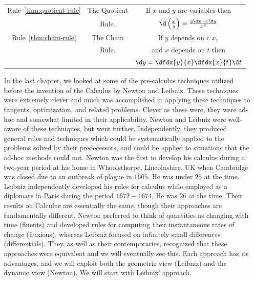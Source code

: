 \begin{table}
\begin{tabular}{ |c|c|c| }
    \hline{}
\small    Rule~\ref{thm:quotient-rule}&\small    The Quotient        &\small If $x$ and $y$ are variables then\\
    &\small           Rule.        &\small  $\d\left(\frac{x}{y}\right) = \frac{y\d x
      - x\d y}{x^2}$\\
    \hline
\small    Rule~\ref{thm:chain-rule}&\small    The Chain        &\small If $y$ depends on
c    $x,$ \\
    &\small    Rule.            &\small and $x$ depends on $t$ then\\
    &\small                     &\small  $\d y = \dfdx{y}{x}\dfdx{x}{t}\d t$\\[2mm]
    \hline
  \end{tabular}
\end{table}
In the last chapter, we looked at some of the pre-calculus techniques
utilized before the invention of the Calculus by Newton and Leibniz.
These techniques were extremely clever and much was accomplished in
applying these techniques to tangents, optimization, and related
problems.  Clever as these were, they were ad-hoc and somewhat limited
in their applicability.  Newton and Leibniz were well-aware of these
techniques, but went further.  Independently, they produced general
rules and techniques which could be systematically applied to the
problems solved by their predecessors, and could be applied to
situations that the ad-hoc methods could not.  Newton was the first to
develop his calculus during a two-year period at his home in
Whoolsthorpe, Lincolnshire, UK when Cambridge was closed due to an
outbreak of plague in $1665.$  He was under $25$ at the time.  Leibniz
independently developed his rules for calculus while employed as a
diplomate in Paris during the period $1672-1674.$  He was $26$ at the
time.  Their results on Calculus are essentially the same, though
their approaches are fundamentally different.  Newton preferred to
think of quantities as changing with time (fluents) and developed
rules for computing their instantaneous rates of change (fluxions),
whereas Leibniz focused on infinitely small differences
(differentials).  They, as well as their contemporaries, recognized
that these approaches were equivalent and we will eventually see this.
Each approach has its advantages, and we will exploit both the
geometric view (Leibniz) and the dynamic view (Newton).  We will start
with Leibniz' approach.  

